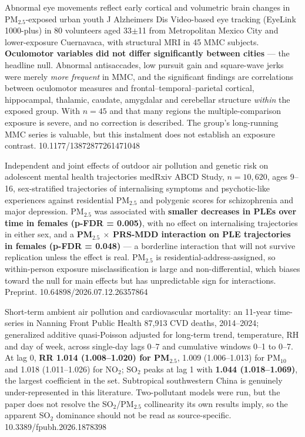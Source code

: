 \documentclass[10pt]{article}
\begin{document}
{Abnormal eye movements reflect early cortical and volumetric brain changes in PM$_{2.5}$-exposed urban youth}
{J Alzheimers Dis}
{Video-based eye tracking (EyeLink 1000-plus) in 80 volunteers aged 33$\pm$11 from
Metropolitan Mexico City and lower-exposure Cuernavaca, with structural MRI in 45 MMC
subjects. \textbf{Oculomotor variables did not differ significantly between cities} ---
the headline null. Abnormal antisaccades, low pursuit gain and square-wave jerks were
merely \emph{more frequent} in MMC, and the significant findings are correlations between
oculomotor measures and frontal--temporal--parietal cortical, hippocampal, thalamic,
caudate, amygdalar and cerebellar structure \emph{within} the exposed group. With
$n=45$ and that many regions the multiple-comparison exposure is severe, and no
correction is described. The group's long-running MMC series is valuable, but this
instalment does not establish an exposure contrast.}
{10.1177/13872877261471048}

{Independent and joint effects of outdoor air pollution and genetic risk on adolescent mental health trajectories}
{medRxiv}
{ABCD Study, $n=10{,}620$, ages 9--16, sex-stratified trajectories of internalising
symptoms and psychotic-like experiences against residential PM$_{2.5}$ and polygenic
scores for schizophrenia and major depression. PM$_{2.5}$ was associated with
\textbf{smaller decreases in PLEs over time in females (p-FDR = 0.005)}, with no effect
on internalising trajectories in either sex, and a \textbf{PM$_{2.5}$ $\times$ PRS-MDD
interaction on PLE trajectories in females (p-FDR = 0.048)} --- a borderline interaction
that will not survive replication unless the effect is real. PM$_{2.5}$ is
residential-address-assigned, so within-person exposure misclassification is large and
non-differential, which biases toward the null for main effects but has unpredictable
sign for interactions. Preprint.}
{10.64898/2026.07.12.26357864}


{Short-term ambient air pollution and cardiovascular mortality: an 11-year time-series in Nanning}
{Front Public Health}
{87{,}913 CVD deaths, 2014--2024; generalized additive quasi-Poisson adjusted for
long-term trend, temperature, RH and day of week, across single-day lags 0--7 and
cumulative windows 0--1 to 0--7. At lag 0, \textbf{RR 1.014 (1.008--1.020) for
PM$_{2.5}$}, 1.009 (1.006--1.013) for PM$_{10}$ and 1.018 (1.011--1.026) for NO$_2$;
SO$_2$ peaks at lag 1 with \textbf{1.044 (1.018--1.069)}, the largest coefficient in the
set. Subtropical southwestern China is genuinely under-represented in this literature.
Two-pollutant models were run, but the paper does not resolve the SO$_2$/PM$_{2.5}$
collinearity its own results imply, so the apparent SO$_2$ dominance should not be read
as source-specific.}
{10.3389/fpubh.2026.1878398}
\end{document}

